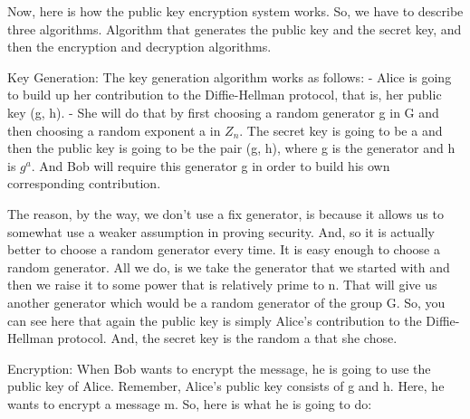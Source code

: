 \documentclass[11pt]{article}
\begin{document}
Now, here is how the public key encryption system works. So, we have to
describe three algorithms. Algorithm that generates the public key and
the secret key, and then the encryption and decryption algorithms.

Key Generation: The key generation algorithm works as follows: - Alice
is going to build up her contribution to the Diffie-Hellman protocol,
that is, her public key (g, h). - She will do that by first choosing a
random generator g in G and then choosing a random exponent a in
\(Z_{n}\). The secret key is going to be a and then the public key is
going to be the pair (g, h), where g is the generator and h is
\(g^{a}\). And Bob will require this generator g in order to build his
own corresponding contribution.

The reason, by the way, we don't use a fix generator, is because it
allows us to somewhat use a weaker assumption in proving security. And,
so it is actually better to choose a random generator every time. It is
easy enough to choose a random generator. All we do, is we take the
generator that we started with and then we raise it to some power that
is relatively prime to n. That will give us another generator which
would be a random generator of the group G. So, you can see here that
again the public key is simply Alice's contribution to the
Diffie-Hellman protocol. And, the secret key is the random a that she
chose.

Encryption: When Bob wants to encrypt the message, he is going to use
the public key of Alice. Remember, Alice's public key consists of g and
h. Here, he wants to encrypt a message m. So, here is what he is going
to do:
\end{document}
